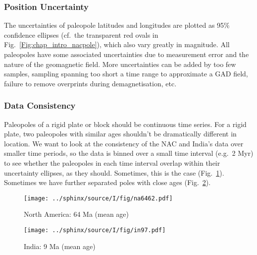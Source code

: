 \subsubsection{Position Uncertainty}\label{sec:posu}

The uncertainties of paleopole latitudes and longitudes are plotted as 95\%
confidence ellipses (cf.\ the transparent red ovals in
Fig.~\ref{Fig:chap_intro_nacpole}), which also vary greatly in magnitude. All
paleopoles have some associated uncertainties due to measurement error and the
nature of the geomagnetic field. More uncertainties can be added by too few
samples, sampling spanning too short a time range to approximate a GAD field,
failure to remove overprints during demagnetisation, etc.

\subsubsection{Data Consistency}\label{sec:datcons}

Paleopoles of a rigid plate or block should be continuous time series. For a
rigid plate, two paleopoles with similar ages shouldn't be dramatically
different in location. We want to look at the consistency of the NAC and India's
data over smaller time periods, so the data is binned over a small time interval
(e.g.\ 2 Myr) to see whether the paleopoles in each time interval overlap within
their uncertainty ellipses, as they should. Sometimes, this is the case
(Fig.~\ref{Fig:chap_intro_na6462agemean}). Sometimes we have further separated
poles with close ages (Fig.~\ref{Fig:chap_intro_in97agemean}).

\begin{figure*}[!ht]
  \captionsetup[subfigure]{labelformat=empty,aboveskip=-6pt,belowskip=-6pt}
  \centering
  \begin{subfigure}[htbp]{.49\textwidth}
    \captionsetup{skip=0pt}  %
    \centering
    \texttt{[image: ../sphinx/source/I/fig/na6462.pdf]}
    \caption{North America: 64 Ma (mean age)}\label{Fig:chap_intro_na6462agemean}
  \end{subfigure}
  \begin{subfigure}[htbp]{.49\textwidth}
    \captionsetup{skip=0pt}
    \centering
    \texttt{[image: ../sphinx/source/I/fig/in97.pdf]}
    \caption{India: 9 Ma (mean age)}\label{Fig:chap_intro_in97agemean}
  \end{subfigure}
  \caption[Example of AMP moving averaging effects]{Overlapping and further
    separated paleopoles of the NAC\@ and India. The oval ellipses are their
    95\% confidence uncertainties. The labels are their result number given in
    GPMDB 4.6b.}\label{Fig:chap_intro_ma-amp}
\end{figure*}

